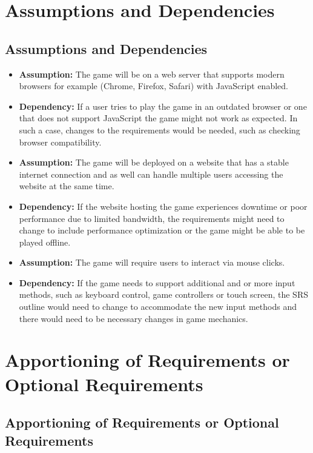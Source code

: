 \documentclass{article}
\begin{document}
\section{Assumptions and Dependencies}
\subsection{Assumptions and Dependencies}

\begin{itemize}
    \item \textbf{Assumption:} The game will be on a web server that supports modern browsers for example (Chrome, Firefox, Safari) with JavaScript enabled.
    \item \textbf{Dependency:} If a user tries to play the game in an outdated browser or one that does not support JavaScript the game might not work as expected. In such a case, changes to the requirements would be needed, such as checking browser compatibility.
    
    \item \textbf{Assumption:} The game will be deployed on a website that has a stable internet connection and as well can handle multiple users accessing the website at the same time.
    \item \textbf{Dependency:} If the website hosting the game experiences downtime or poor performance due to limited bandwidth, the requirements might need to change to include performance optimization or the game might be able to be played offline.

    \item \textbf{Assumption:} The game will require users to interact via mouse clicks.
    \item \textbf{Dependency:} If the game needs to support additional and or more input methods, such as keyboard control, game controllers or touch screen, the SRS outline would need to change to accommodate the new input methods and there would need to be necessary changes in game mechanics.
\end{itemize}

\section{Apportioning of Requirements or Optional Requirements}
\subsection{Apportioning of Requirements or Optional Requirements}
\end{document}

